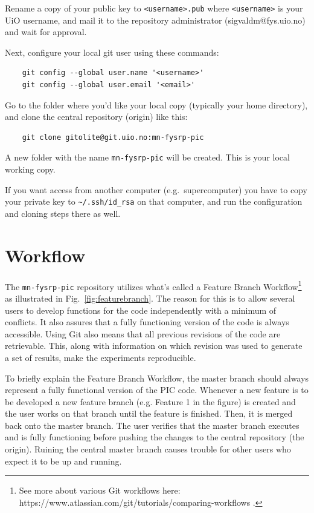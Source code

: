 \documentclass[10pt,a4paper]{article}
\newcommand{\mnfysrppic}{\texttt{mn-fysrp-pic}}
\newcommand{\reffig}[1]{Fig.~\ref{fig:#1}}
\begin{document}
Rename a copy of your public key to \verb$<username>.pub$ where \verb$<username>$ is your UiO username, and mail it to the repository administrator (sigvaldm@fys.uio.no) and wait for approval.

Next, configure your local git user using these commands:

\begin{verbatim}
	git config --global user.name '<username>'
	git config --global user.email '<email>'
\end{verbatim}
Go to the folder where you'd like your local copy (typically your home directory), and clone the central repository (origin) like this:

\begin{verbatim}
	git clone gitolite@git.uio.no:mn-fysrp-pic
\end{verbatim}
A new folder with the name \verb$mn-fysrp-pic$ will be created. This is your local working copy.

If you want access from another computer (e.g.\ supercomputer) you have to copy your private key to \verb$~/.ssh/id_rsa$ on that computer, and run the configuration and cloning steps there as well. 

\section{Workflow}
The \mnfysrppic{} repository utilizes what's called a Feature Branch Workflow\footnote{See more about various Git workflows here: https://www.atlassian.com/git/tutorials/comparing-workflows .} as illustrated in \reffig{featurebranch}. The reason for this is to allow several users to develop functions for the code independently with a minimum of conflicts. It also assures that a fully functioning version of the code is always accessible. Using Git also means that all previous revisions of the code are retrievable. This, along with information on which revision was used to generate a set of results, make the experiments reproducible. 

To briefly explain the Feature Branch Workflow, the master branch should always represent a fully functional version of the PIC code. Whenever a new feature is to be developed a new feature branch (e.g. Feature 1 in the figure) is created and the user works on that branch until the feature is finished. Then, it is merged back onto the master branch. The user verifies that the master branch executes and is fully functioning before pushing the changes to the central repository (the origin). Ruining the central master branch causes trouble for other users who expect it to be up and running. 
\end{document}
